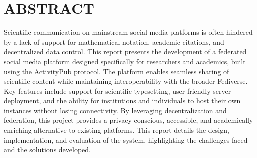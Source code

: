 \chapter*{ABSTRACT}

Scientific communication on mainstream social media platforms is often hindered by a lack of support for mathematical notation, academic citations, and decentralized data control. This report presents the development of a federated social media platform designed specifically for researchers and academics, built using the ActivityPub protocol. The platform enables seamless sharing of scientific content while maintaining interoperability with the broader Fediverse. Key features include support for scientific typesetting, user-friendly server deployment, and the ability for institutions and individuals to host their own instances without losing connectivity. By leveraging decentralization and federation, this project provides a privacy-conscious, accessible, and academically enriching alternative to existing platforms. This report details the design, implementation, and evaluation of the system, highlighting the challenges faced and the solutions developed.
